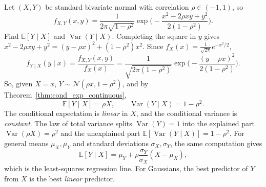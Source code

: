 	\begin{example}
		\label{ex:cond-exp-bivariate-normal}
		Let $(X, Y)$ be standard bivariate normal with correlation $\rho \in (-1, 1)$, so
		\begin{equation}
			f_{X,Y}(x, y) = \frac{1}{2\pi\sqrt{1 - \rho^2}} \exp\!\bigg(-\frac{x^2 - 2\rho x y + y^2}{2(1 - \rho^2)}\bigg).
		\end{equation}
		Find $\mathbb{E}[Y \mid X]$ and $\operatorname{Var}(Y \mid X)$. Completing the square in $y$ gives $x^2 - 2\rho x y + y^2 = (y - \rho x)^2 + (1 - \rho^2) x^2$. Since $f_X(x) = \frac{1}{\sqrt{2\pi}} e^{-x^2/2}$,
		\begin{equation}
			f_{Y \mid X}(y \mid x) = \frac{f_{X,Y}(x, y)}{f_X(x)} = \frac{1}{\sqrt{2\pi(1 - \rho^2)}} \exp\!\bigg(-\frac{(y - \rho x)^2}{2(1 - \rho^2)}\bigg).
		\end{equation}
		So, given $X = x$, $Y \sim \mathcal{N}(\rho x, 1 - \rho^2)$, and by Theorem~\ref{thm:cond_exp_continuous},
		\begin{equation}
			\mathbb{E}[Y \mid X] = \rho X, \qquad \operatorname{Var}(Y \mid X) = 1 - \rho^2.
		\end{equation}
		The conditional expectation is \emph{linear} in $X$, and the conditional variance is \emph{constant}. The law of total variance splits $\operatorname{Var}(Y) = 1$ into the explained part $\operatorname{Var}(\rho X) = \rho^2$ and the unexplained part $\mathbb{E}[\operatorname{Var}(Y \mid X)] = 1 - \rho^2$. For general means $\mu_X, \mu_Y$ and standard deviations $\sigma_X, \sigma_Y$, the same computation gives
		\begin{equation}
			\mathbb{E}[Y \mid X] = \mu_Y + \rho \frac{\sigma_Y}{\sigma_X} (X - \mu_X),
		\end{equation}
		which is the least-squares regression line. For Gaussians, the best predictor of $Y$ from $X$ is the best \emph{linear} predictor.
	\end{example}

